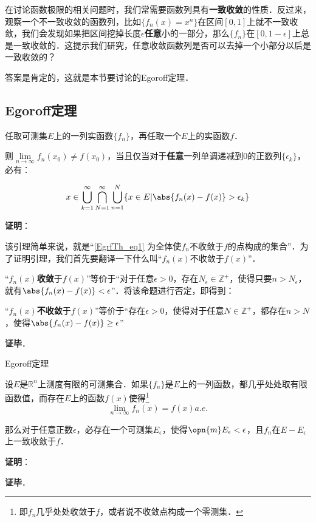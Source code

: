 
在讨论函数极限的相关问题时，我们常需要函数列具有\textbf{一致收敛}的性质．反过来，观察一个不一致收敛的函数列，比如$\{f_n(x)=x^n\}$在区间$[0, 1]$上就不一致收敛，我们会发现如果把区间挖掉长度$\epsilon$\textbf{任意}小的一部分，那么$\{f_n\}$在$[0, 1-\epsilon]$上总是一致收敛的．这提示我们研究，任意收敛函数列是否可以去掉一个小部分以后是一致收敛的？

答案是肯定的，这就是本节要讨论的Egoroff定理．

\subsection{Egoroff定理}

\begin{lemma}{}
任取可测集$E$上的一列实函数$\{f_n\}$，再任取一个$E$上的实函数$f$．

则$\lim\limits_{n\to\infty}f_n(x_0)\neq f(x_0)$，当且仅当对于\textbf{任意}一列单调递减到$0$的正数列$\{\epsilon_k\}$，必有：

\begin{equation}\label{EgrfTh_eq1}
x\in\bigcup^\infty_{k=1}\bigcap^\infty_{N=1}\bigcup^N_{n=1} \{x\in E|\abs{f_n(x)-f(x)}>\epsilon_k\}
\end{equation}

\end{lemma}

\textbf{证明}：

该引理简单来说，就是“\autoref{EgrfTh_eq1} 为全体使$f_n$不收敛于$f$的点构成的集合”．为了证明引理，我们首先要翻译一下什么叫“$f_n(x)$不收敛于$f(x)$”．

“$f_n(x)$\textbf{收敛}于$f(x)$”等价于“对于任意$\epsilon>0$，存在$N_\epsilon\in\mathbb{Z}^+$，使得只要$n>N_\epsilon$，就有$\abs{f_n(x)-f(x)}<\epsilon$”．将该命题进行否定，即得到：

“$f_n(x)$\textbf{不收敛}于$f(x)$”等价于“存在$\epsilon>0$，使得对于任意$N\in\mathbb{Z}^+$，都存在$n>N$，使得$\abs{f_n(x)-f(x)}\geq\epsilon$”

\textbf{证毕}．








\begin{theorem}{Egoroff定理}

设$E$是$\mathbb{R}^n$上测度有限的可测集合．如果$\{f_n\}$是$E$上的一列函数，都几乎处处取有限函数值，而存在$E$上的函数$f(x)$使得\footnote{即$f_n$几乎处处收敛于$f$，或者说不收敛点构成一个零测集．}\begin{equation}
\lim\limits_{n\to\infty}f_n(x)=f(x)a. e. 
\end{equation}

那么对于任意正数$\epsilon$，必存在一个可测集$E_\epsilon$，使得$\opn{m}E_\epsilon<\epsilon$，且$f_n$在$E-E_\epsilon$上一致收敛于$f$．

\end{theorem}

\textbf{证明}：



\textbf{证毕}．










